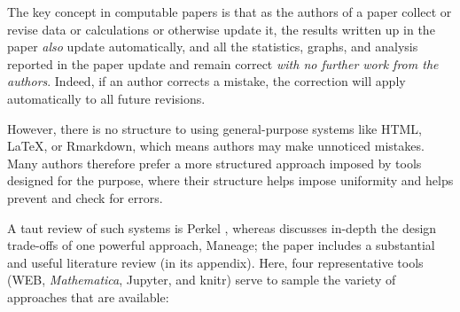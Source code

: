 \documentclass{comjnl}
\begin{document}
The key concept in computable papers is that as the authors of a paper collect or revise data or calculations or otherwise update it, the results written up in the paper \emph{also\/} update automatically, and all the statistics, graphs, and analysis reported in the paper update and remain correct \emph{with no further work from the authors}. Indeed, if an author corrects a mistake, the correction will apply automatically to all future revisions.

However, there is no structure to using general-purpose systems like HTML, \LaTeX, or Rmarkdown, which means authors may make unnoticed mistakes. Many authors therefore prefer a more structured approach imposed by tools designed for the purpose, where their structure helps impose uniformity and helps prevent and check for errors. 

A taut review of such systems is Perkel \cite{perkel-review}, whereas \cite{maneage} discusses in-depth the design trade-offs of one powerful approach, Maneage; the paper \cite{maneage} includes  a substantial and useful literature review (in its appendix). Here, four representative tools (WEB, \emph{Mathematica}, Jupyter, and knitr) serve to sample the variety of approaches that are available:
\end{document}
